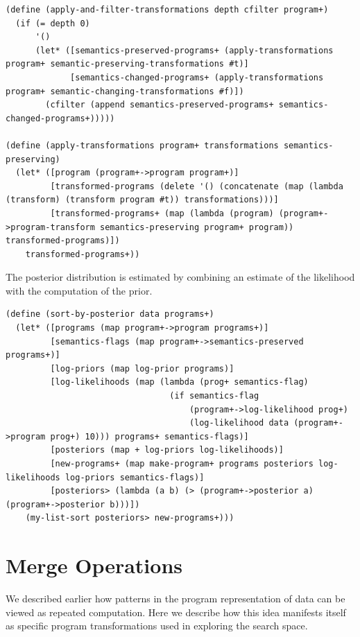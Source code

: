 \documentclass[a4paper,10pt]{article}
\begin{document}
\begin{lstlisting}[frame=trBL]
(define (apply-and-filter-transformations depth cfilter program+)
  (if (= depth 0)
      '()
      (let* ([semantics-preserved-programs+ (apply-transformations program+ semantic-preserving-transformations #t)]
             [semantics-changed-programs+ (apply-transformations program+ semantic-changing-transformations #f)])
        (cfilter (append semantics-preserved-programs+ semantics-changed-programs+)))))

(define (apply-transformations program+ transformations semantics-preserving)
  (let* ([program (program+->program program+)]
         [transformed-programs (delete '() (concatenate (map (lambda (transform) (transform program #t)) transformations)))]
         [transformed-programs+ (map (lambda (program) (program+->program-transform semantics-preserving program+ program)) transformed-programs)])
    transformed-programs+))
\end{lstlisting}
The posterior distribution is estimated by combining an estimate of the likelihood with the computation of the prior.  
\begin{lstlisting}[frame=trBL]
(define (sort-by-posterior data programs+)
  (let* ([programs (map program+->program programs+)]
         [semantics-flags (map program+->semantics-preserved programs+)]
         [log-priors (map log-prior programs)]
         [log-likelihoods (map (lambda (prog+ semantics-flag)
                                 (if semantics-flag
                                     (program+->log-likelihood prog+)
                                     (log-likelihood data (program+->program prog+) 10))) programs+ semantics-flags)]
         [posteriors (map + log-priors log-likelihoods)] 
         [new-programs+ (map make-program+ programs posteriors log-likelihoods log-priors semantics-flags)]
         [posteriors> (lambda (a b) (> (program+->posterior a) (program+->posterior b)))])
    (my-list-sort posteriors> new-programs+)))
\end{lstlisting}
\section{Merge Operations}
We described earlier how patterns in the program representation of data can be viewed as repeated computation.  Here we describe how this idea manifests itself as specific program transformations used in exploring the search space.
\end{document}
